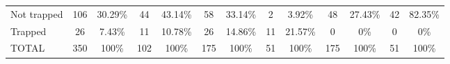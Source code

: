 \documentclass[a4paper,11pt,oneside]{article}
\begin{document}
\begin{table}
\begin{tabular}{lcccccccccccc}
Not trapped    & 106                    & 30.29\% & 44                     & 43.14\% & 58                     & 33.14\% & 2                      & 3.92\%  & 48                     & 27.43\% & 42                     & 82.35\% \\
Trapped        & 26                     & 7.43\%  & 11                     & 10.78\% & 26                     & 14.86\% & 11                     & 21.57\% & 0                      & 0\%     & 0                      & 0\%     \\
\midrule
TOTAL          & 350                    & 100\%   & 102                    & 100\%   & 175                    & 100\%   & 51                     & 100\%   & 175                    & 100\%   & 51                     & 100\%   \\
\bottomrule
\end{tabular}
\end{table}




\pagebreak
\clearpage
\end{document}
